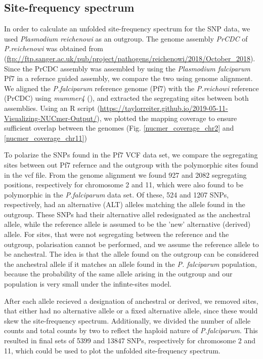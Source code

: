 \documentclass[11pt]{article}
\begin{document}
\subsection*{Site-frequency spectrum}
\label{sec:org06d2de7}
In order to calculate an unfolded site-frequency spectrum for the SNP data, we used \emph{Plasmodium reichenowi} as an outgroup. The genome assembly \emph{PrCDC} of \emph{P.reichenowi} was obtained from (\url{ftp://ftp.sanger.ac.uk/pub/project/pathogens/reichenowi/2018/October\_2018}). Since the PrCDC assembly was assembled by using the \emph{Plasmodium falciparum} Pf7 in a refernce guided assembly, we compare the two using genome alignment. We aligned the \emph{P.falciparum} reference genome (Pf7) with the \emph{P.reichowi} reference (PrCDC) using \emph{mummer4} (\cite{marcais-2018-mummer}), and extracted the segregating sites between both assemblies. Using an R script (\url{https://taylorreiter.github.io/2019-05-11-Visualizing-NUCmer-Output/}), we plotted the mapping coverage to ensure sufficient overlap between the genomes (Fig. \ref{nucmer_coverage_chr2} and \ref{nucmer_coverage_chr11})

To polarize the SNPs found in the Pf7 VCF data set, we compare the segregating sites between out Pf7 refernce and the outgroup with the polymorphic sites found in the vcf file. From the genome alignment we found 927 and 2082 segregating positions, respectively for chromosome 2 and 11, which were also found to be polymorphic in the \emph{P.falciparum} data set. Of these, 524 and 1207 SNPs, respectively, had an alternative (ALT) alleles matching the allele found in the outgroup. These SNPs had their alternative allel redesignated as the anchestral allele, while the reference allele is assumed to be the 'new' alternative (derived) allele. For sites, that were not segregating between the reference and the outgroup, polarisation cannot be performed, and we assume the reference allele to be anchestral. The idea is that the allele found on the outgroup can be considered the anchestral allele if it matches an allele found in the \emph{P. falciparum} population, because the probability of the same allele arising in the outgroup and our population is very small under the infinte-sites model.

After each allele recieved a designation of anchestral or derived, we removed sites, that either had no alternative allele or a fixed alternative allele, since these would skew the site-frequency spectrum. Additionally, we divided the number of allele counts and total counts by two to reflect the haploid nature of \emph{P.falciparum}. This resulted in final sets of 5399 and 13847 SNPs, respectively for chromosome 2 and 11, which could be used to plot the unfolded site-frequency spectrum.
\end{document}
